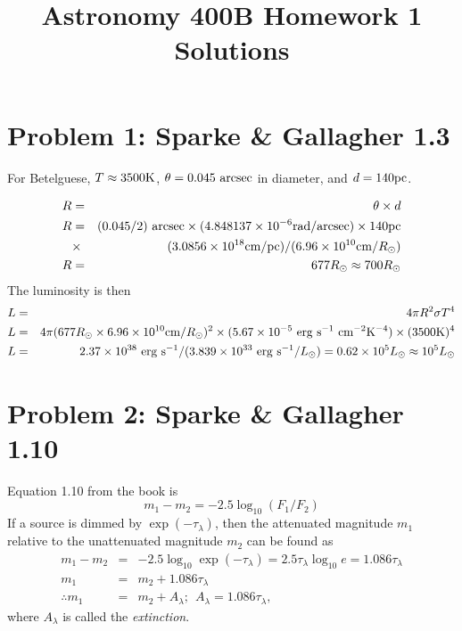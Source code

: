 \documentclass[]{article}
\title{Astronomy 400B Homework 1 Solutions}
\author{\vspace{-10ex}}
\date{\vspace{-10ex}}
\begin{document}
\maketitle

\section{Problem 1: Sparke \& Gallagher 1.3}

For Betelguese, $T\approx3500\mathrm{K}$, $\theta=0.045~\mathrm{arcsec}$ in diameter, and $d=140\mathrm{pc}$.

\begin{eqnarray}
R &=& \theta \times d\\
R &=& (0.045/2)~\mathrm{arcsec} \times (4.848137 \times 10^{-6} \mathrm{rad} / \mathrm{arcsec}) \times 140 \mathrm{pc} \nonumber \\ &\times& (3.0856\times10^{18}\mathrm{cm}/\mathrm{pc}) / (6.96\times10^{10} \mathrm{cm}/R_{\odot}) \\
R &=& 677R_{\odot} \approx 700R_{\odot}
\end{eqnarray}
\noindent
The luminosity is then
\begin{eqnarray}
L &=& 4\pi R^2 \sigma T^{4}\\
L &=& 4\pi (677R_{\odot}\times 6.96\times 10^{10}\mathrm{cm}/R_{\odot})^{2} \times (5.67 \times10^{-5}~\mathrm{erg}~\mathrm{s}^{-1}~\mathrm{cm}^{-2}\mathrm{K}^{-4})\times(3500\mathrm{K})^{4}\\
L &=& 2.37\times10^{38}~\mathrm{erg}~\mathrm{s}^{-1} / (3.839\times10^{33}~\mathrm{erg}~\mathrm{s}^{-1} / L_{\odot}) = 0.62\times10^{5}L_{\odot}\approx10^{5}L_{\odot}
\end{eqnarray}

\section{Problem 2: Sparke \& Gallagher 1.10}

Equation 1.10 from the book is
\begin{equation}
m_1 - m_2 = -2.5 \log_{10} (F_1/F_2)
\end{equation}
\noindent
If a source is dimmed by $\exp(-\tau_{\lambda})$, then
the attenuated magnitude $m_1$ relative to the unattenuated
magnitude $m_2$ can be found as
\begin{eqnarray}
m_1 - m_2 &=& -2.5 \log_{10} \exp(-\tau_{\lambda}) = 2.5 \tau_{\lambda} \log_{10} e = 1.086\tau_{\lambda}\\
m_1 &=& m_2 + 1.086\tau_{\lambda}\\
\therefore m_1 &=& m_2 + A_{\lambda};~~A_{\lambda} = 1.086\tau_{\lambda},
\end{eqnarray}
\noindent
where $A_{\lambda}$ is called the {\it extinction}.
\end{document}
